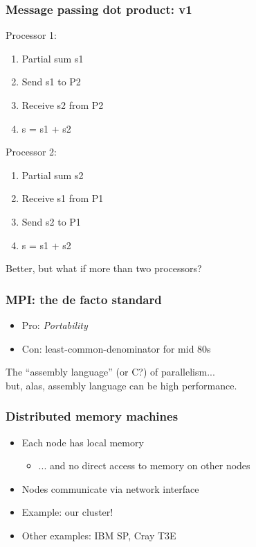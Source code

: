\documentclass{beamer}
\begin{document}
\begin{frame}
  \frametitle{Message passing dot product: v1}

  \begin{minipage}{0.45\textwidth}
    Processor 1:
    \begin{enumerate}
    \item Partial sum s1
    \item Send s1 to P2
    \item Receive s2 from P2
    \item s = s1 + s2
    \end{enumerate}
  \end{minipage}
  \begin{minipage}{0.45\textwidth}
    Processor 2:
    \begin{enumerate}
    \item Partial sum s2
    \item Receive s1 from P1
    \item Send s2 to P1
    \item s = s1 + s2
    \end{enumerate}
  \end{minipage}

  \vspace{1cm}
  Better, but what if more than two processors?

\end{frame}


\begin{frame}
  \frametitle{MPI: the de facto standard}

  \begin{itemize}
  \item Pro: {\em Portability}
  \item Con: least-common-denominator for mid 80s
  \end{itemize}
  The ``assembly language'' (or C?) of parallelism... \\
  \hspace{5mm} but, alas, assembly language can be high performance.

\end{frame}


\begin{frame}
  \frametitle{Distributed memory machines}
  
  \begin{itemize}
  \item Each node has local memory
    \begin{itemize}
    \item ... and no direct access to memory on other nodes
    \end{itemize}
  \item Nodes communicate via network interface
  \item Example: our cluster!
  \item Other examples: IBM SP, Cray T3E
  \end{itemize}
\end{frame}
\end{document}
